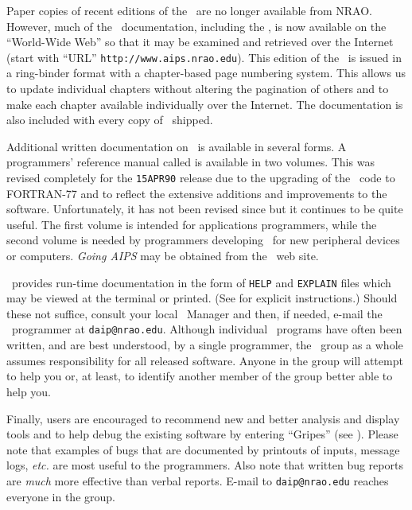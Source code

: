 Paper copies of recent editions of the \COOKBOOK\ are no longer
available from NRAO\@.  However, much of the \AIPS\ documentation,
including the  \COOKBOOK, is now available on the ``World-Wide Web''
so that it may be examined and retrieved over the Internet (start with
``URL'' {\tt http://www.aips.nrao.edu}).  This edition of the
\COOKBOOK\ is issued in a ring-binder format with a
chapter-based page numbering system.  This allows us to update
individual chapters without altering the pagination of others and to
make each chapter available individually over the Internet.  The
documentation is also included with every copy of \AIPS\ shipped.

     Additional written documentation on \AIPS\ is available in
several forms.  A programmers' reference manual called {\it
{}\/} is available in two volumes.  This was revised
completely for the {\tt 15APR90} release due to the upgrading of the
\AIPS\ code to FORTRAN-77 and to reflect the extensive additions and
improvements to the software.  Unfortunately, it has not been revised
since but it continues to be quite useful.  The first volume is
intended for applications programmers, while the second volume is
needed by programmers developing \AIPS\ for new peripheral devices or
computers.  {\it Going AIPS\/} may be obtained from the \AIPS\ web
site.

     \AIPS\ provides run-time documentation in the form of {\tt HELP}
and {\tt EXPLAIN} files which may be viewed at the terminal or
printed. (See  for explicit instructions.)  Should these not
suffice, consult your local \AIPS\ Manager and then, if needed, e-mail
the \AIPS\ programmer at {\tt daip@nrao.edu}.  Although individual
\AIPS\ programs have often been written, and are best understood, by a
single programmer, the \AIPS\ group as a whole assumes responsibility
for all released software.  Anyone in the group will attempt to help
you or, at least, to identify another member of the group better able
to help you.

     Finally, users are encouraged to recommend new and better
analysis and display tools and to help debug the existing software by
entering ``Gripes'' (see ).  Please note that examples of
bugs that are documented by printouts of inputs, message logs, {\it
etc.\/} are most useful to the programmers.  Also note that written
bug reports are {\it much\/} more effective than verbal reports.
E-mail to {\tt daip@nrao.edu} reaches everyone in the group.


